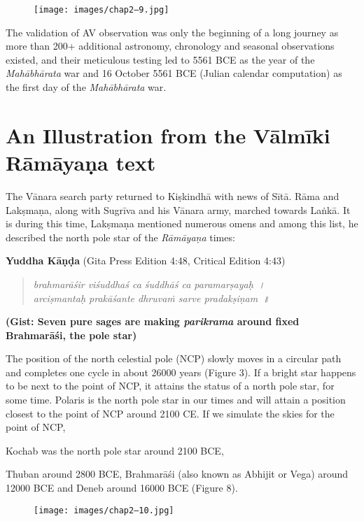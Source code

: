\begin{figure}
\texttt{[image: images/chap2–9.jpg]}
\end{figure}

The validation of AV observation was only the beginning of a long journey as more than 200+ additional astronomy, chronology and seasonal observations existed, and their meticulous testing led to 5561 BCE as the year of the \textit{Mahābhārata} war and 16 October 5561 BCE (Julian calendar computation) as the first day of the \textit{Mahābhārata} war.


\section*{An Illustration from the Vālmīki Rāmāyaṇa text}

The Vānara search party returned to Kiṣkindhā with news of Sītā. Rāma and Lakṣmaṇa, along with Sugrīva and his Vānara army, marched towards Laṅkā. It is during this time, Lakṣmaṇa mentioned numerous omens and among this list, he described the north pole star of the \textit{Rāmāyaṇa} times:

\textbf{Yuddha Kāṇḍa} (Gita Press Edition 4:48, Critical Edition 4:43)

\begin{verse}
\textit{brahmarāśir viśuddhaś ca śuddhāś ca paramarṣayaḥ~।}\\\textit{arciṣmantaḥ prakāśante dhruvaṁ sarve pradakṣiṇam~॥}
\end{verse}

\textbf{(Gist: Seven pure sages are making \textit{parikrama} around fixed Brahmarāśi, the pole star)}

The position of the north celestial pole (NCP) slowly moves in a circular path and completes one cycle in about 26000 years (Figure 3). If a bright star happens to be next to the point of NCP, it attains the status of a north pole star, for some time. Polaris is the north pole star in our times and will attain a position closest to the point of NCP around 2100 CE. If we simulate the skies for the point of NCP,

Kochab was the north pole star around 2100 BCE,

Thuban around 2800 BCE, Brahmarāśi (also known as Abhijit or Vega) around 12000 BCE and Deneb around 16000 BCE (Figure 8).

\begin{figure}
\texttt{[image: images/chap2–10.jpg]}
\end{figure}

